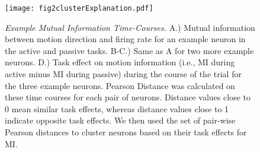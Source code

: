 	\begin{figure}
		\captionsetup{singlelinecheck = false, font=footnotesize, labelsep=space}
		\centering
		\texttt{[image: fig2clusterExplanation.pdf]}
		\caption{{\it Example Mutual Information Time-Courses.} A.) Mutual information between motion direction and firing rate for an example neuron in the active and passive tasks. B-C.) Same as A for two more example neurons. D.) Task effect on motion information (i.e., MI during active minus MI during passive) during the course of the trial for the three example neurons. Pearson Distance was calculated on these time courses for each pair of neurons. Distance values close to 0 mean similar task effects, whereas distance values close to 1 indicate opposite task effects. We then used the set of pair-wise Pearson distances to cluster neurons based on their task effects for MI.}
		\label{fig:clustering}
	\end{figure}
	\addtocounter{page}{-1}
	\thispagestyle{empty}
	\clearpage



